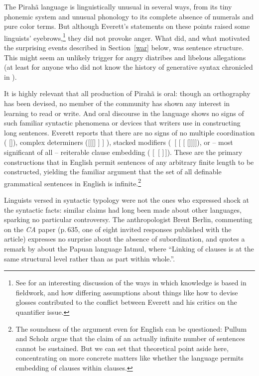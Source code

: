 \documentclass[output=paper,colorlinks,citecolor=brown
]{langscibook}
\begin{document}
The Pirah{\~a} language is linguistically unusual in several ways,
from its tiny phonemic system and unusual phonology to its complete
absence of numerals and pure color terms. But although Everett's
statements on these points raised some linguists'
eyebrows,\footnote{\label{dobrin}
   See \citealt{DobrSchw21} for an interesting discussion of the ways
   in which knowledge is based in fieldwork, and how differing
   assumptions about things like how to devise glosses contributed
   to the conflict between Everett and his critics on the quantifier
   issue.}
they did not provoke anger. What did, and what motivated the surprising
events described in Section~\ref{war} below, was sentence structure.
This might seem an unlikely trigger for angry diatribes and libelous
allegations (at least for anyone who did not know the history of
generative syntax chronicled in \citealt{Harris21}).

It is highly relevant that all production of Pirah{\~a} is oral:
though an orthography has been devised, no member of the community
has shown any interest in learning to read or write. And oral
discourse in the language shows no signs of such familiar syntactic
phenomena or devices that writers use in constructing long sentences.
Everett reports that there are no signs of no multiple coordination
( []),
complex determiners ([[[] ] ]
), stacked modifiers (~[ [
[ []]]]), or -- most significant
of all -- reiterable clause embedding ( [\, [\,\,]\,]). These are the primary
constructions that in English permit sentences of any arbitrary finite
length to be constructed, yielding the familiar argument that the set
of all definable grammatical sentences in English is
infinite.\footnote{\label{infinity}
   The soundness of the argument even for English can be questioned:
   Pullum and Scholz \citeyearpar[115--124]{PullScho10} argue that
   the claim of an actually infinite number of sentences cannot be
   sustained. But we can set that theoretical point aside here,
   concentrating on more concrete matters like whether the language
   permits embedding of clauses within clauses.}

\label{page-non-infinite-languages-start}Linguists versed in syntactic
typology were not the ones who expressed shock at the syntactic facts:
similar claims had long been made about other languages, sparking no
particular controversy. The anthropologist Brent Berlin, commenting
on the \textit{CA} paper (p.\,635, one of eight invited responses
published with the article) expresses no surprise about the absence
of subordination, and quotes a remark by \citet[177]{Foley86}
about the Papuan language Iatmul, where ``Linking of clauses is at the
same structural level rather than as part within whole.''.
\end{document}
